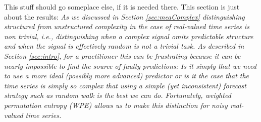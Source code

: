 This stuff should go someplace else, if it is needed there.  This
section is just about the results: {\sl As we discussed in Section
  \ref{sec:meaComplex} distinguishing structured from unstructured
  complexity in the case of real-valued time series is non trivial,
  i.e., distinguishing when a complex signal omits predictable
  structure and when the signal is effectively random is not a trivial
  task. As described in Section \ref{sec:intro}, for a practitioner
  this can be frustrating because it can be nearly impossible to find
  the source of faulty predictions: Is it simply that we need to use a
  more ideal (possibly more advanced) predictor or is it the case that
  the time series is simply so complex that using a simple (yet
  inconsistent) forecast strategy such as random walk is the best we
  can do. Fortunately, weighted permutation entropy (WPE) allows us to
  make this distinction for noisy real-valued time series.}

